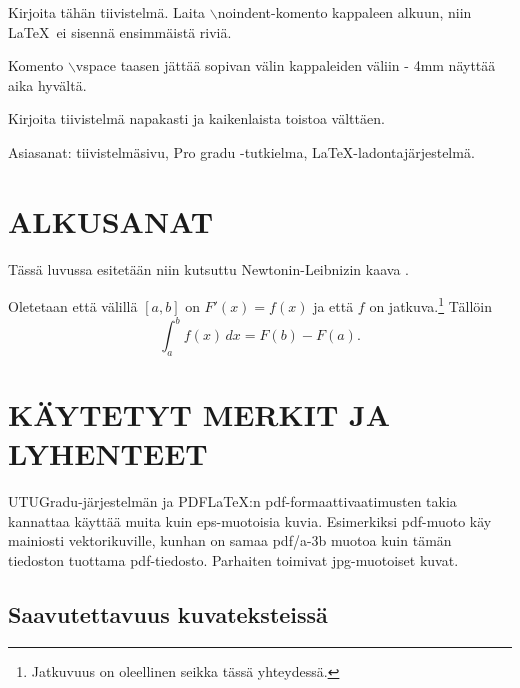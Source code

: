
\vspace{4mm}\noindent Kirjoita tähän tiivistelmä. Laita $\backslash${noindent}-komento kappaleen
alkuun, niin \LaTeX\, ei sisennä ensimmäistä riviä.

\vspace{4mm}\noindent Komento $\backslash$vspace taasen jättää sopivan välin kappaleiden väliin - 4mm näyttää aika hyvältä.

\vspace{4mm}\noindent Kirjoita tiivistelmä napakasti ja kaikenlaista toistoa välttäen.

\vspace{4mm}\noindent Asiasanat: tiivistelmäsivu, Pro gradu -tutkielma, \LaTeX-ladontajärjestelmä.



\newpage\null
\tableofcontents



\newpage\null
\pagestyle{plain} 

\section{ALKUSANAT}

Tässä luvussa esitetään niin kutsuttu Newtonin-Leibnizin kaava \cite{NewtLeib}.

\begin{theorem} Oletetaan että välillä $[a,b]$ on $F'(x)=f(x)$ ja että $f$ on jatkuva.\footnote{Jatkuvuus on oleellinen seikka tässä yhteydessä.} Tällöin
\[
\int_a^bf(x)\,dx=F(b)-F(a).
\]
\end{theorem}


\section{KÄYTETYT MERKIT JA LYHENTEET}

UTUGradu-järjestelmän ja PDF\LaTeX :n pdf-formaattivaatimusten takia kannattaa käyttää muita kuin eps-muotoisia kuvia. Esimerkiksi pdf-muoto käy mainiosti vektorikuville, kunhan on samaa pdf/a-3b muotoa kuin tämän tiedoston tuottama pdf-tiedosto. Parhaiten toimivat jpg-muotoiset kuvat.



\subsection{Saavutettavuus kuvateksteissä}

